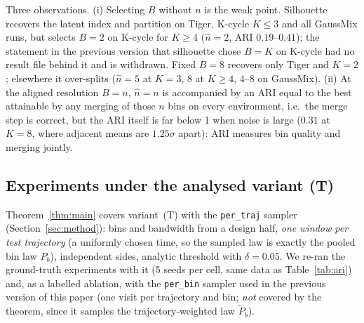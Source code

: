 \documentclass[10pt]{article}
\begin{document}
Three observations.  (i) Selecting $B$ without $n$ is the weak point.
Silhouette recovers the latent index and partition on Tiger, K-cycle $K\le3$ and
all GaussMix runs, but selects $B=2$ on K-cycle for $K\ge4$ ($\hat n=2$, ARI
$0.19$--$0.41$); the statement in the previous version that silhouette chose
$B=K$ on K-cycle had no result file behind it and is withdrawn.  Fixed $B=8$
recovers only Tiger and $K=2$; elsewhere it over-splits ($\hat n=5$ at $K=3$,
$8$ at $K\ge4$, $4$--$8$ on GaussMix).  (ii) At the aligned resolution
$B=n$, $\hat n=n$ is accompanied by an ARI equal to the best attainable by any
merging of those $n$ bins on every environment, i.e.\ the merge step is correct, but the ARI itself is far below 1
when noise is large ($0.31$ at $K=8$, where adjacent means are $1.25\sigma$
apart): ARI measures bin quality and merging jointly.  

\subsection{Experiments under the analysed variant (T)}
\label{sec:variantT}
Theorem~\ref{thm:main} covers variant~(T) with the \texttt{per\_traj} sampler
(Section~\ref{sec:method}): bins and bandwidth from a design half, \emph{one
window per test trajectory} (a uniformly chosen time, so the sampled law is
exactly the pooled bin law $P_b$), independent sides, analytic threshold with
$\delta=0.05$.  We re-ran the ground-truth experiments with it (5 seeds per
cell, same data as Table~\ref{tab:ari}) and, as a labelled ablation, with the
\texttt{per\_bin} sampler used in the previous version of this paper (one visit
per trajectory and bin; \emph{not} covered by the theorem, since it samples the
trajectory-weighted law $\tilde P_b$).
\end{document}
